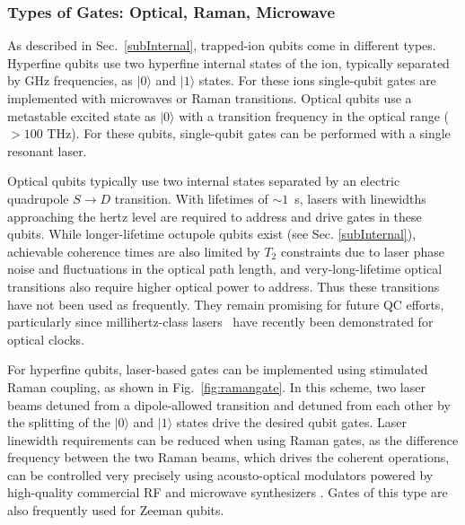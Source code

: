 \documentclass[%
12pt,
 amsmath,amssymb,
]{revtex4-2}
\newcommand{\zero}{|0 \rangle}
\newcommand{\one}{|1 \rangle}
\begin{document}
    \subsubsection{Types of Gates: Optical, Raman, Microwave}
\label{Gatetypes}
As described in Sec.~\ref{subInternal}, trapped-ion qubits come in different types. Hyperfine qubits use two hyperfine internal states of the ion, typically separated by GHz frequencies, as $\zero$ and $\one$ states. For these ions single-qubit gates are implemented with microwaves or Raman transitions. Optical qubits use a metastable excited state as $\zero$ with a transition frequency in the optical range ($> 100$ THz). For these qubits, single-qubit gates can be performed with a single resonant laser.

Optical qubits typically use two internal states separated by an electric quadrupole $S \rightarrow D$ transition. With lifetimes of ${\sim}1$~s, lasers with linewidths approaching the hertz level are required to address and drive gates in these qubits. While longer-lifetime octupole qubits exist (see Sec. \ref{subInternal}), achievable coherence times are also limited by $T_2$ constraints due to laser phase noise and fluctuations in the optical path length, and very-long-lifetime optical transitions also require higher optical power to address. Thus these transitions have not been used as frequently. They remain promising for future QC efforts, particularly since millihertz-class lasers~\cite{Kessler2012} have recently been demonstrated for optical clocks.


For hyperfine qubits, laser-based gates can be implemented using stimulated Raman coupling, as shown in Fig.~\ref{fig:ramangate}. In this scheme, two laser beams detuned from a dipole-allowed transition and detuned from each other by the splitting of the $|0\rangle$ and  $|1\rangle$ states drive the desired qubit gates. Laser linewidth requirements can be reduced when using Raman gates, as the difference frequency between the two Raman beams, which drives the coherent operations, can be controlled very precisely using acousto-optical modulators powered by high-quality commercial RF and microwave synthesizers \cite{leibfried2003quantum}. Gates of this type are also frequently used for Zeeman qubits.
\end{document}
